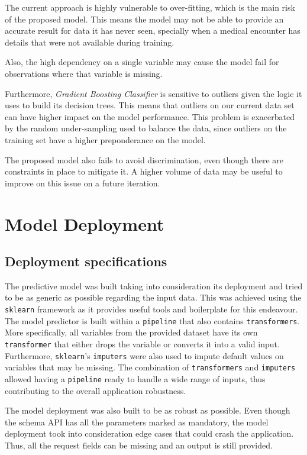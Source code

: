 \documentclass[a4paper,11pt]{article}
\begin{document}
The current approach is highly vulnerable to over-fitting, which is the main risk of the proposed model. This means the model may not be able to provide an accurate result for data it has never seen, specially when a medical encounter has details that were not available during training.

Also, the high dependency on a single variable may cause the model fail for observations where that variable is missing.

Furthermore, \textit{Gradient Boosting Classifier} is sensitive to outliers given the logic it uses to build its decision trees. This means that outliers on our current data set can have higher impact on the model performance. This problem is exacerbated by the random under-sampling used to balance the data, since outliers on the training set have a higher preponderance on the model.

The proposed model also fails to avoid discrimination, even though there are constraints in place to mitigate it. A higher volume of data may be useful to improve on this issue on a future iteration.

\newpage
\section{Model Deployment}
\subsection{Deployment specifications}


The predictive model was built taking into consideration its deployment and tried to be as generic as possible regarding the input data. This was achieved using the \texttt{sklearn} framework as it provides useful tools and boilerplate for this endeavour.
The model predictor is built within a \texttt{pipeline} that also contains \texttt{transformers}. More specifically, all variables from the provided dataset have its own \texttt{transformer} that either drops the variable or converts it into a valid input. Furthermore, \texttt{sklearn}'s \texttt{imputers} were also used to impute default values on variables that may be missing.
The combination of \texttt{transformers} and \texttt{imputers} allowed having a \texttt{pipeline} ready to handle a wide range of inputs, thus contributing to the overall application robustness.

The model deployment was also built to be as robust as possible. Even though the schema API has all the parameters marked as mandatory, the model deployment took into consideration edge cases that could crash the application. Thus, all the request fields can be missing and an output is still provided.
\end{document}
